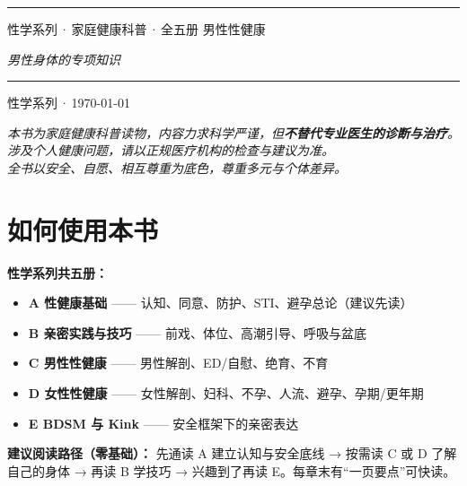 \documentclass[12pt,UTF8,openany]{ctexbook}
\begin{document}
\begin{titlepage}
\centering
\vspace*{1.5cm}
\vspace{0.6cm}
\noindent\rule{\textwidth}{0.4pt}
\vspace{0.5cm}
\myhei{} 性学系列\,·\,家庭健康科普\,·\,全五册
\vspace{2.5cm}
\myhei{} 男性性健康\par
\vspace{1.2cm}
\itshape{} 男性身体的专项知识\par
\vspace{5.2cm}
\noindent\rule{\textwidth}{0.4pt}
\vspace{0.5cm}
 性学系列\,·\,\today
\end{titlepage}

\begin{center}\itshape
本书为家庭健康科普读物，内容力求科学严谨，但\textbf{不替代专业医生的诊断与治疗}。\\
涉及个人健康问题，请以正规医疗机构的检查与建议为准。\\
全书以安全、自愿、相互尊重为底色，尊重多元与个体差异。\par\end{center}
\clearpage

\chapter*{如何使用本书}
\noindent\textbf{性学系列共五册：}
\begin{itemize}[leftmargin=2em]
\item \textbf{A 性健康基础} —— 认知、同意、防护、STI、避孕总论（建议先读）
\item \textbf{B 亲密实践与技巧} —— 前戏、体位、高潮引导、呼吸与盆底
\item \textbf{C 男性性健康} —— 男性解剖、ED/自慰、绝育、不育
\item \textbf{D 女性性健康} —— 女性解剖、妇科、不孕、人流、避孕、孕期/更年期
\item \textbf{E BDSM 与 Kink} —— 安全框架下的亲密表达
\end{itemize}
\vspace{0.6em}
\noindent\textbf{建议阅读路径（零基础）：} 先通读 A 建立认知与安全底线 → 按需读 C 或 D 了解自己的身体 → 再读 B 学技巧 → 兴趣到了再读 E。每章末有“一页要点”可快读。
\clearpage
\end{document}
